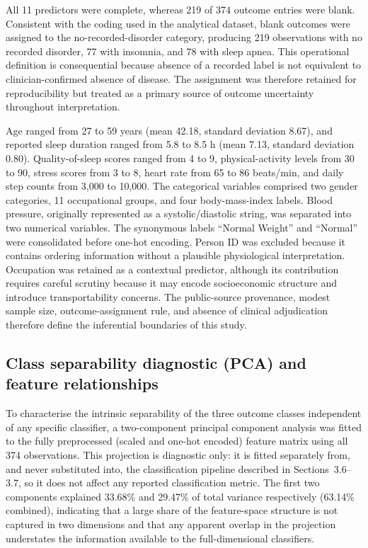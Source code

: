 \documentclass{elektr}
\begin{document}
All 11 predictors were complete, whereas 219 of 374 outcome entries were blank. Consistent with the coding used in the analytical dataset, blank outcomes were assigned to the no-recorded-disorder category, producing 219 observations with no recorded disorder, 77 with insomnia, and 78 with sleep apnea. This operational definition is consequential because absence of a recorded label is not equivalent to clinician-confirmed absence of disease. The assignment was therefore retained for reproducibility but treated as a primary source of outcome uncertainty throughout interpretation.

Age ranged from 27 to 59 years (mean 42.18, standard deviation 8.67), and reported sleep duration ranged from 5.8 to 8.5 h (mean 7.13, standard deviation 0.80). Quality-of-sleep scores ranged from 4 to 9, physical-activity levels from 30 to 90, stress scores from 3 to 8, heart rate from 65 to 86 beats/min, and daily step counts from 3,000 to 10,000. The categorical variables comprised two gender categories, 11 occupational groups, and four body-mass-index labels. Blood pressure, originally represented as a systolic/diastolic string, was separated into two numerical variables. The synonymous labels ``Normal Weight'' and ``Normal'' were consolidated before one-hot encoding. Person ID was excluded because it contains ordering information without a plausible physiological interpretation. Occupation was retained as a contextual predictor, although its contribution requires careful scrutiny because it may encode socioeconomic structure and introduce transportability concerns. The public-source provenance, modest sample size, outcome-assignment rule, and absence of clinical adjudication therefore define the inferential boundaries of this study.

\subsection{Class separability diagnostic (PCA) and feature relationships}
\label{sec:pca}
To characterise the intrinsic separability of the three outcome classes independent of any specific classifier, a two-component principal component analysis was fitted to the fully preprocessed (scaled and one-hot encoded) feature matrix using all 374 observations. This projection is diagnostic only: it is fitted separately from, and never substituted into, the classification pipeline described in Sections~3.6--3.7, so it does not affect any reported classification metric. The first two components explained 33.68\% and 29.47\% of total variance respectively (63.14\% combined), indicating that a large share of the feature-space structure is not captured in two dimensions and that any apparent overlap in the projection understates the information available to the full-dimensional classifiers.
\end{document}

